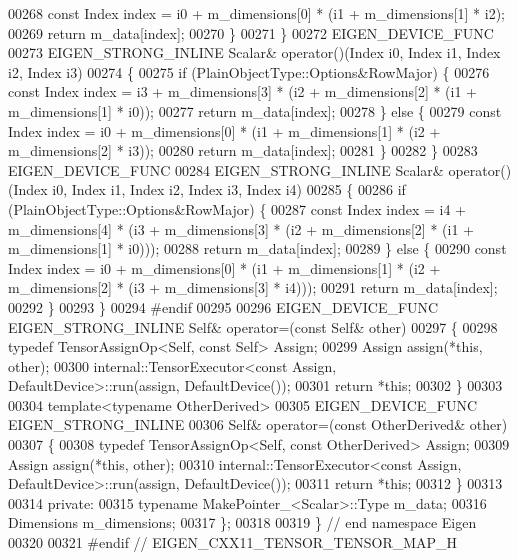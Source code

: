 \begin{DoxyCode}
00268          \textcolor{keyword}{const} Index index = i0 + m\_dimensions[0] * (i1 + m\_dimensions[1] * i2);
00269         \textcolor{keywordflow}{return} m\_data[index];
00270       \}
00271     \}
00272     EIGEN\_DEVICE\_FUNC
00273     EIGEN\_STRONG\_INLINE Scalar& operator()(Index i0, Index i1, Index i2, Index i3)
00274     \{
00275       \textcolor{keywordflow}{if} (PlainObjectType::Options&RowMajor) \{
00276         \textcolor{keyword}{const} Index index = i3 + m\_dimensions[3] * (i2 + m\_dimensions[2] * (i1 + m\_dimensions[1] * i0));
00277         \textcolor{keywordflow}{return} m\_data[index];
00278       \} \textcolor{keywordflow}{else} \{
00279         \textcolor{keyword}{const} Index index = i0 + m\_dimensions[0] * (i1 + m\_dimensions[1] * (i2 + m\_dimensions[2] * i3));
00280         \textcolor{keywordflow}{return} m\_data[index];
00281       \}
00282     \}
00283     EIGEN\_DEVICE\_FUNC
00284     EIGEN\_STRONG\_INLINE Scalar& operator()(Index i0, Index i1, Index i2, Index i3, Index i4)
00285     \{
00286       \textcolor{keywordflow}{if} (PlainObjectType::Options&RowMajor) \{
00287         \textcolor{keyword}{const} Index index = i4 + m\_dimensions[4] * (i3 + m\_dimensions[3] * (i2 + m\_dimensions[2] * (i1 + 
      m\_dimensions[1] * i0)));
00288         \textcolor{keywordflow}{return} m\_data[index];
00289       \} \textcolor{keywordflow}{else} \{
00290         \textcolor{keyword}{const} Index index = i0 + m\_dimensions[0] * (i1 + m\_dimensions[1] * (i2 + m\_dimensions[2] * (i3 + 
      m\_dimensions[3] * i4)));
00291         \textcolor{keywordflow}{return} m\_data[index];
00292       \}
00293     \}
00294 \textcolor{preprocessor}{#endif}
00295 
00296     EIGEN\_DEVICE\_FUNC EIGEN\_STRONG\_INLINE Self& operator=(\textcolor{keyword}{const} Self& other)
00297     \{
00298       \textcolor{keyword}{typedef} TensorAssignOp<Self, const Self> Assign;
00299       Assign assign(*\textcolor{keyword}{this}, other);
00300       internal::TensorExecutor<const Assign, DefaultDevice>::run(assign, DefaultDevice());
00301       \textcolor{keywordflow}{return} *\textcolor{keyword}{this};
00302     \}
00303 
00304     \textcolor{keyword}{template}<\textcolor{keyword}{typename} OtherDerived>
00305     EIGEN\_DEVICE\_FUNC EIGEN\_STRONG\_INLINE
00306     Self& operator=(\textcolor{keyword}{const} OtherDerived& other)
00307     \{
00308       \textcolor{keyword}{typedef} TensorAssignOp<Self, const OtherDerived> Assign;
00309       Assign assign(*\textcolor{keyword}{this}, other);
00310       internal::TensorExecutor<const Assign, DefaultDevice>::run(assign, DefaultDevice());
00311       \textcolor{keywordflow}{return} *\textcolor{keyword}{this};
00312     \}
00313 
00314   \textcolor{keyword}{private}:
00315     \textcolor{keyword}{typename} MakePointer\_<Scalar>::Type m\_data;
00316     Dimensions m\_dimensions;
00317 \};
00318 
00319 \} \textcolor{comment}{// end namespace Eigen}
00320 
00321 \textcolor{preprocessor}{#endif // EIGEN\_CXX11\_TENSOR\_TENSOR\_MAP\_H}
\end{DoxyCode}
